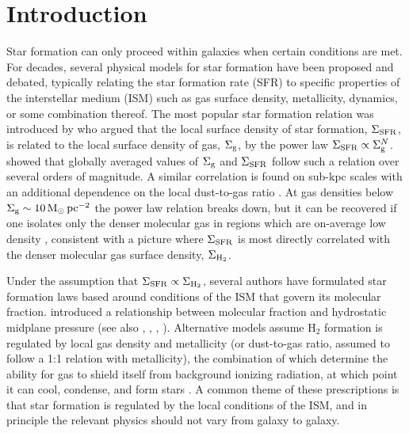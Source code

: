 \documentclass[fleqn,usenatbib]{mnras}
\begin{document}
\section{Introduction}
\label{sec:intro}
Star formation can only proceed within galaxies when certain conditions are met. For decades, several physical models for star formation have been proposed and debated, typically relating the star formation rate (SFR) to specific properties of the interstellar medium (ISM) such as gas surface density, metallicity, dynamics, or some combination thereof.  The most popular star formation relation was introduced by \citet{Schmidt59} who argued that the local surface density of star formation, $\Sigma_{\rm SFR}$, is related to the local surface density of gas, $\Sigma_{\rm g}$, by the power law $\Sigma_{\rm SFR} \propto \Sigma_{\rm g}^N$.  \citet{Kennicutt98} showed that globally averaged values of $\Sigma_{\rm g}$ and $\Sigma_{\rm SFR}$ follow such a relation over several orders of magnitude.  A similar correlation is found on sub-kpc scales \citep{Bigiel08} with an additional dependence on the local dust-to-gas ratio \citep{Leroy13}.  At gas densities below $\Sigma_{\rm g}\sim10\,{\rm M_{\odot}\,pc^{-2}}$ the power law relation breaks down, but it can be recovered if one isolates only the denser molecular gas in regions which are on-average low density \citep{Schruba11}, consistent with a picture where $\Sigma_{\rm SFR}$ is most directly correlated with the denser molecular gas surface density, $\Sigma_{\rm H_2}$.  

Under the assumption that $\Sigma_{\rm SFR}\propto\Sigma_{\rm H_2}$, several authors have formulated star formation laws based around conditions of the ISM that govern its molecular fraction.  \citet{Elmegreen89} introduced a relationship between molecular fraction and hydrostatic midplane pressure (see also \citealt{Elmegreen94}, \citealt{Wong02}, \citealt{Blitz04}, \citealt{Blitz06}).  Alternative models assume H$_2$ formation is regulated by local gas density and metallicity (or dust-to-gas ratio, assumed to follow a 1:1 relation with metallicity), the combination of which determine the ability for gas to shield itself from background ionizing radiation, at which point it can cool, condense, and form stars \citep{Schaye04,Krumholz09,Krumholz12}. A common theme of these prescriptions is that star formation is regulated by the local conditions of the ISM, and in principle the relevant physics should not vary from galaxy to galaxy. 
\end{document}
